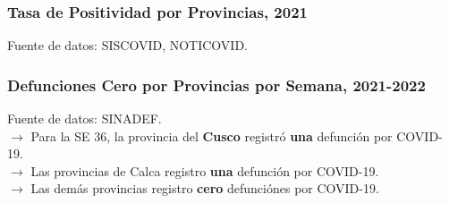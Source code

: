 \documentclass[xcolor=table]{beamer}
\begin{document}
	\begin{frame}
		\frametitle{Tasa de Positividad por Provincias, 2021}
		\vspace{-.5cm}
		
		\begin{table}[]
			\resizebox{\textwidth}{!}{%
				
			}
		\end{table}	
		{\tiny Fuente de datos: SISCOVID, NOTICOVID.}
		
	\end{frame}
	
	\begin{frame}
		\frametitle{Defunciones Cero por Provincias por Semana, 2021-2022}
		\vspace{-.5cm}
		
		\begin{table}[]
			\resizebox{\textwidth}{!}{%
				
			}
		\end{table}	
		{\tiny Fuente de datos: SINADEF. \\}
		\vspace{0.2cm}
		$\rightarrow$ Para la SE 36, la provincia del \textbf{\color{mycolor5}Cusco} registró \textbf{\color{mycolor5}una} defunción por COVID-19.\\
		$\rightarrow$ Las provincias de Calca registro \textbf{\color{mycolor5}una} defunción por COVID-19.\\ 
		$\rightarrow$ Las demás provincias  registro \textbf{\color{mycolor5}cero} defunciónes por COVID-19.\\
	\end{frame}
	
\end{document}
